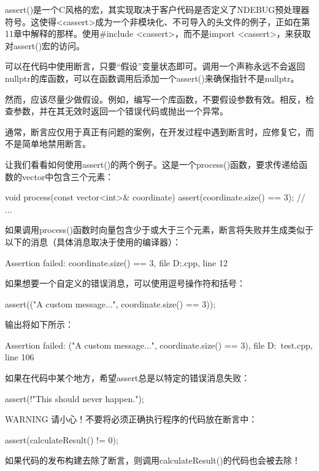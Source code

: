 assert()是一个C风格的宏，其实现取决于客户代码是否定义了NDEBUG预处理器符号。这使得<cassert>成为一个非模块化、不可导入的头文件的例子，正如在第11章中解释的那样。使用\#include <cassert>，而不是import <cassert>，来获取对assert()宏的访问。

可以在代码中使用断言，只要“假设”变量状态即可。调用一个声称永远不会返回nullptr的库函数，可以在函数调用后添加一个assert()来确保指针不是nullptr。

然而，应该尽量少做假设。例如，编写一个库函数，不要假设参数有效。相反，检查参数，并在其无效时返回一个错误代码或抛出一个异常。

通常，断言应仅用于真正有问题的案例，在开发过程中遇到断言时，应修复它，而不是简单地禁用断言。

让我们看看如何使用assert()的两个例子。这是一个process()函数，要求传递给函数的vector中包含三个元素：

\begin{cpp}
void process(const vector<int>& coordinate)
{
    assert(coordinate.size() == 3);
    // ...
}
\end{cpp}

如果调用process()函数时向量包含少于或大于三个元素，断言将失败并生成类似于以下的消息（具体消息取决于使用的编译器）：

\begin{shell}
Assertion failed: coordinate.size() == 3, file D:\test\test.cpp, line 12
\end{shell}

如果想要一个自定义的错误消息，可以使用逗号操作符和括号：

\begin{cpp}
assert(("A custom message...", coordinate.size() == 3));
\end{cpp}

输出将如下所示：

\begin{shell}
Assertion failed: ("A custom message...", coordinate.size() == 3), file D:\test\
test.cpp, line 106
\end{shell}

如果在代码中某个地方，希望assert总是以特定的错误消息失败：

\begin{cpp}
assert(!"This should never happen.");
\end{cpp}

\begin{myWarning}{WARNING}
请小心！不要将必须正确执行程序的代码放在断言中：

\begin{cpp}
assert(calculateResult() != 0);
\end{cpp}

如果代码的发布构建去除了断言，则调用calculateResult()的代码也会被去除！
\end{myWarning}

